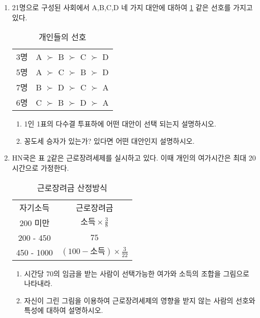 \documentclass{article}
\begin{document}
\begin{enumerate}[{\bf 문제 \arabic*.}]
        \pagebreak
        
    \item 21명으로 구성된 사회에서 A,B,C,D 네 가지 대안에 대하여 \ref{tab:votep} \와 같은 선호를 가지고 있다. 
        \begin{table}[htbp]
            \centering
            \begin{tabular}{cc}
                 3명 & A $\succ$ B $\succ$ C $\succ$ D \\
                 5명 & A $\succ$ C $\succ$ B $\succ$ D \\
                 7명 & B $\succ$ D $\succ$ C $\succ$ A \\
                 6명 & C $\succ$ B $\succ$ D $\succ$ A
            \end{tabular}
            \caption{개인들의 선호}
            \label{tab:votep}
        \end{table}
        \begin{enumerate}
            \item 1인 1표의 다수결 투표하에 어떤 대안이 선택 되는지 설명하시오.
            \item 꽁도세 승자가 있는가? 있다면 어떤 대안인지 설명하시오.
        \end{enumerate}
        
        
    \item HN국은 표 \ref{tab:eitc}\와 같은 근로장려세제를 실시하고 있다. 이때 개인의 여가시간은 최대 20시간으로 가정한다.
        \begin{table}[htbp]
            \centering
            \begin{tabular}{cc}
                 자기소득 & 근로장려금 \\
                 200 미만 & $\text{소득} \times \frac{3}{8}$ \\ 
                 200 - 450 & $75$ \\ 
                 450 - 1000 & $ (100 - \text{소득}) \times \frac{3}{22}$ \\ 
            \end{tabular}
            \caption{근로장려금 산정방식}
            \label{tab:eitc}
        \end{table}
        \begin{enumerate}
            \item 시간당 70의 임금을 받는 사람이 선택가능한 여가와 소득의 조합을 그림으로 나타내라.
            \item 자신이 그린 그림을 이용하여 근로장려세제의 영향을 받지 않는 사람의 선호와 특성에 대하여 설명하시오.
        \end{enumerate}
    

\end{enumerate}
\end{document}
